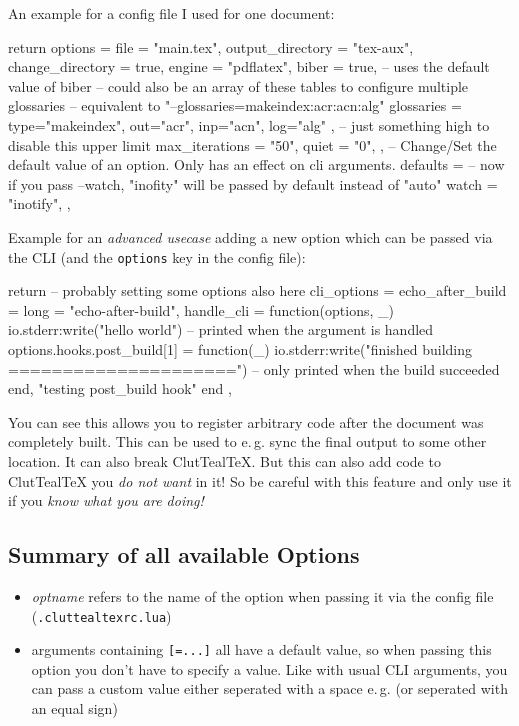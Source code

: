 \documentclass[a4paper, 11pt]{scrartcl}
\newcommand\eg{e.\,g.\xspace}
\let\TeXold\TeX
\newcommand\CluttealTeX{ClutTeal\TeX\xspace}
\renewcommand\TeX{\TeXold\xspace}
\begin{document}
An example for a config file I used for one document:
\begin{boxcode}[{[5.3]Lua}]
return {
	options = {
		file = "main.tex",
		output_directory = "tex-aux",
		change_directory = true,
		engine = "pdflatex",
		biber = true, -- uses the default value of biber
		-- could also be an array of these tables to configure multiple glossaries
		-- equivalent to "--glossaries=makeindex:acr:acn:alg"
		glossaries = {
			type="makeindex",
			out="acr",
			inp="acn",
			log="alg"
		},
		-- just something high to disable this upper limit
		max_iterations = "50",
		quiet = "0",
	},
	-- Change/Set the default value of an option. Only has an effect on cli arguments.
	defaults = {
		-- now if you pass --watch, "inofity" will be passed by default instead of "auto"
		watch = "inotify",
	},
}
\end{boxcode}

Example for an \emph{advanced usecase} adding a new option which can be passed via the CLI (and the \texttt{options} key in the config file):
\begin{boxcode}[{[5.3]Lua}]
return {
	-- probably setting some options also here
	cli_options = {
		echo_after_build = {
			long = "echo-after-build",
			handle_cli = function(options, _)
			io.stderr:write("hello world\n") -- printed when the argument is handled
			options.hooks.post_build[1] = {function(_)
				io.stderr:write("finished building =====================\n") -- only printed when the build succeeded
			end, "testing post_build hook"}
			end
		},
	}
}
\end{boxcode}
You can see this allows you to register arbitrary code after the document was completely built.
This can be used to \eg sync the final output to some other location.
It can also break \CluttealTeX.
But this can also add code to \CluttealTeX you \emph{do not want} in it!
So be careful with this feature and only use it if you \emph{know what you are doing!}

\begin{landscape}
\section{Summary of all available Options} \label{sec:listOpt}
\begin{itemize}
	\item \emph{optname} refers to the name of the option when passing it via the config file (\texttt{.cluttealtexrc.lua})
	\item arguments containing \texttt{[=...]} all have a default value, so when passing this option you don't have to specify a value.
		Like with usual CLI arguments, you can pass a custom value either seperated with a space \eg {} (or seperated with an equal sign)
\end{itemize}

\end{landscape}
\end{document}

